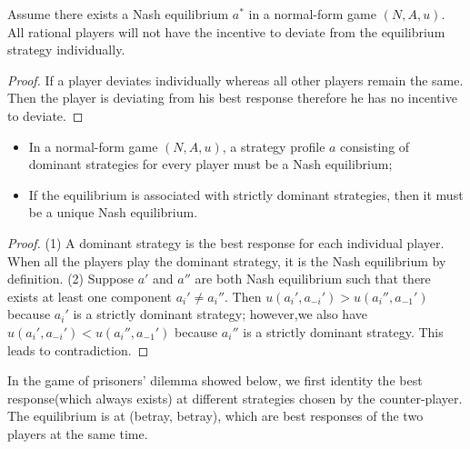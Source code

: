 \begin{refsection}
\begin{theorem}\cite[9]{gibbons1992game}
Assume there exists a Nash equilibrium $a^*$ in a normal-form game $(N,A,u)$. All rational players will not have the incentive to deviate from the equilibrium strategy individually.
\end{theorem}
\begin{proof}
If a player deviates individually whereas all other players remain the same. Then the player is deviating from his best response therefore he has no incentive to deviate.
\end{proof}

\begin{theorem}\hfill
\begin{itemize}
	\item In a normal-form game $(N,A,u)$, a strategy profile $a$ consisting of dominant strategies for every player must be a Nash equilibrium;
	\item If the equilibrium is associated with strictly dominant strategies, then it must be a unique Nash equilibrium.
\end{itemize}	
\end{theorem}
\begin{proof}
(1) A dominant strategy is the best response for each individual player. When all the players play the dominant strategy, it is the Nash equilibrium by definition.
(2) Suppose $a'$ and $a''$ are both Nash equilibrium such that there exists at least one component $a_i'\neq a_i''$. 
Then $u(a_i',a_{-i}') > u(a_i'',a_{-1}')$ because $a_i'$ is a strictly dominant strategy; however,we also have $u(a_i',a_{-i}') < u(a_i'',a_{-1}')$ because $a_i''$ is a strictly dominant strategy. This leads to contradiction.   
\end{proof}



\begin{example}
In the game of prisoners' dilemma showed below, we first identity the best response(which always exists) at different strategies chosen by the counter-player. The equilibrium is at (betray, betray), which are best responses of the two players at the same time.
	\begin{center} %
		
		

\end{center}
\end{example}
\end{refsection}
